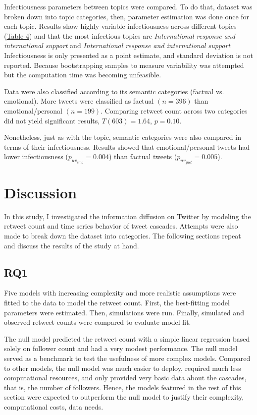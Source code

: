 \documentclass[11pt,a4paper]{article}
\begin{document}
        Infectiousness parameters between topics were compared. To do that, dataset was broken down into topic categories, then, parameter estimation was done once for each topic. Results show highly variable infectiousness across different topics (\hyperlink{fig:topic-dist}{Table 4}) and that the most infectious topics are \textit{International response and international support} and \textit{International response and international support} Infectiousness is only presented as a point estimate, and standard deviation is not reported. Because bootstrapping samples to measure variability was attempted but the computation time was becoming unfeasible.
        
        Data were also classified according to its semantic categories (factual vs. emotional). More tweets were classified as factual $(n = 396)$ than emotional/personal $(n = 199)$. Comparing retweet count across two categories did not yield significant results, $T(603) = 1.64$, $p = 0.10$.

        Nonetheless, just as with the topic, semantic categories were also compared in terms of their infectiousness. Results showed that emotional/personal tweets had lower infectiousness ($p_{{uv}_{emo}} = 0.004$) than factual tweets ($p_{{uv}_{fact}} = 0.005$).
        
\clearpage
\section{Discussion}
    
    In this study, I investigated the information diffusion on Twitter by modeling the retweet count and time series behavior of tweet cascades. Attempts were also made to break down the dataset into categories. The following sections repeat and discuss the results of the study at hand.
    
    \subsection{RQ1}
    Five models with increasing complexity and more realistic assumptions were fitted to the data to model the retweet count. First, the best-fitting model parameters were estimated. Then, simulations were run. Finally, simulated and observed retweet counts were compared to evaluate model fit.
    
    The null model predicted the retweet count with a simple linear regression based solely on follower count and had a very modest performance. The null model served as a benchmark to test the usefulness of more complex models. Compared to other models, the null model was much easier to deploy, required much less computational resources, and only provided very basic data about the cascades, that is, the number of followers. Hence, the models featured in the rest of this section were expected to outperform the null model to justify their complexity, computational costs, data needs.
    
\end{document}
